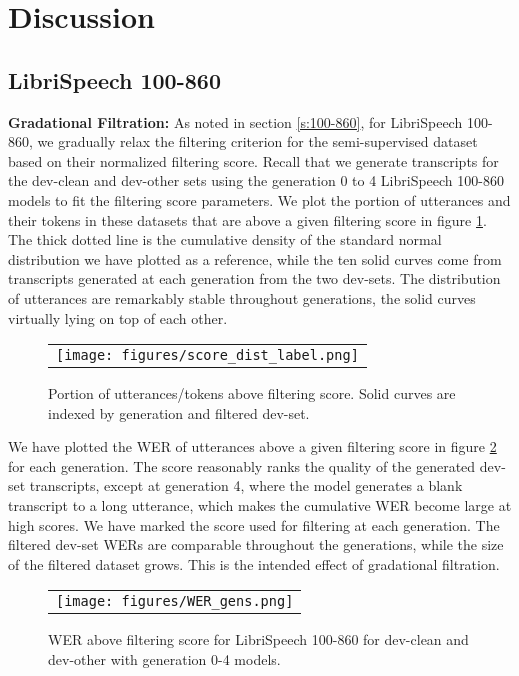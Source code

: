 \documentclass[a4paper]{article}
\begin{document}
\section{Discussion}
\label{s:discussion}

\subsection{LibriSpeech 100-860}

\noindent\textbf{Gradational Filtration:} As noted in section \ref{s:100-860}, for LibriSpeech 100-860, we gradually relax the filtering criterion for the semi-supervised dataset based on their normalized filtering score. Recall that we generate transcripts for the dev-clean and dev-other sets using the generation 0 to 4 LibriSpeech 100-860 models to fit the filtering score parameters. We plot the portion of utterances and their tokens in these datasets that are above a given filtering score in figure \ref{f:scoredist}. The thick dotted line is the cumulative density of the standard normal distribution we have plotted as a reference, while the ten solid curves come from transcripts generated at each generation from the two dev-sets. The distribution of utterances are remarkably stable throughout generations, the solid curves virtually lying on top of each other.

\begin{figure}[h]
  \vskip -0.05in
  \centering
  \begin{tabular}{c}
  \texttt{[image: figures/score\_dist\_label.png]}
  \end{tabular}
  \vskip -0.05in
  \caption{Portion of utterances/tokens above filtering score. Solid curves are indexed by generation and filtered dev-set.}
  \label{f:scoredist}
  \vskip -0.1in
\end{figure}

We have plotted the WER of utterances above a given filtering score in figure \ref{f:WERgens} for each generation. The score reasonably ranks the quality of the generated dev-set transcripts, except at generation 4, where the model generates a blank transcript to a long utterance, which makes the cumulative WER become large at high scores. We have marked the score used for filtering at each generation. The filtered dev-set WERs are comparable throughout the generations, while the size of the filtered dataset grows. This is the intended effect of gradational filtration. 

\begin{figure}[h]
  \vskip -0.05in
  \centering
  \begin{tabular}{c}
  \texttt{[image: figures/WER\_gens.png]}
  \end{tabular}
  \vskip -0.05in
  \caption{WER above filtering score for LibriSpeech 100-860 for dev-clean and dev-other with generation 0-4 models.}
  \label{f:WERgens}
  \vskip -0.1in
\end{figure}
\end{document}
